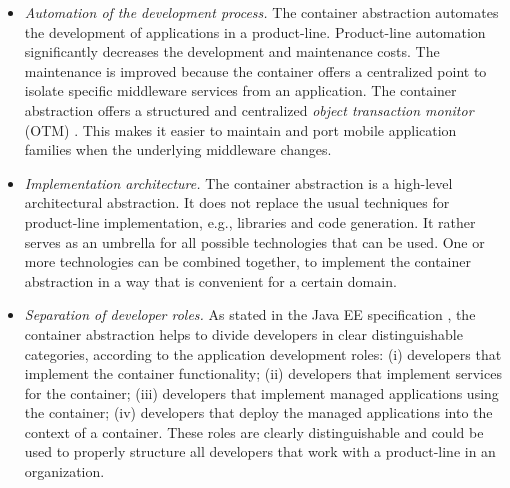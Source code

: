 \begin{itemize}
\item \textit{Automation of the development process.} The container abstraction automates the development of applications in a product-line. Product-line automation significantly decreases the development and maintenance costs. The maintenance is improved because the container offers a centralized point to isolate specific middleware services from an application. The container abstraction offers a structured and centralized \textit{object transaction monitor} (OTM) \cite{otm}. This makes it easier to maintain and port mobile application families when the underlying middleware changes.

\item \textit{Implementation architecture.} The container abstraction is a high-level architectural abstraction. It does not replace the usual techniques for product-line implementation, e.g., libraries and code generation. It rather serves as an umbrella for all possible technologies that can be used. One or more technologies can be combined together, to implement the container abstraction in a way that is convenient for a certain domain. %

\item \textit{Separation of developer roles.} As stated in the Java EE specification \cite{j2ee14}, the container abstraction helps to divide developers in clear distinguishable categories, according to the application development roles: (i) developers that implement the container functionality; (ii)  developers that implement services for the container; (iii)  developers that implement managed applications using the container; (iv) developers that deploy the managed applications into the context of a container. These roles are clearly distinguishable and could be used to properly structure all developers that work with a product-line in an organization.

\end{itemize}

